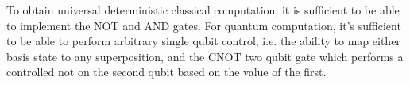 To obtain universal deterministic classical computation, it is sufficient to be able to implement the NOT and AND gates. For quantum computation, it's sufficient to be able to perform arbitrary single qubit control, i.e. the ability to map either basis state to any superposition, and the CNOT two qubit gate which performs a controlled not on the second qubit based on the value of the first.

